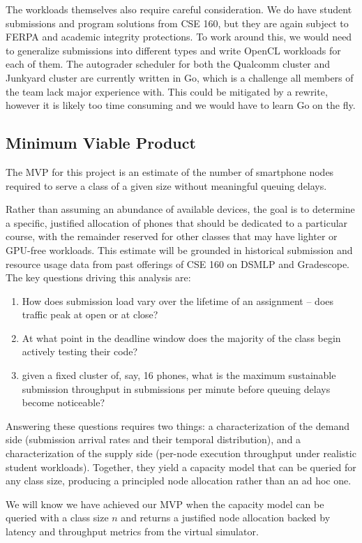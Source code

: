 \documentclass{article}
\begin{document}
The workloads themselves also require careful consideration. We do have student submissions and program solutions from CSE 160, but they are again subject to FERPA and academic integrity protections. To work around this, we would need to generalize submissions into different types and write OpenCL workloads for each of them. The autograder scheduler for both the Qualcomm cluster and Junkyard cluster are currently written in Go, which is a challenge all members of the team lack major experience with. This could be mitigated by a rewrite, however it is likely too time consuming and we would have to learn Go on the fly.
\newpage
\subsection{Minimum Viable Product}

The MVP for this project is an estimate of the number of smartphone nodes required to serve a class of a given size without meaningful queuing delays. 

Rather than assuming an abundance of available devices, the goal is to determine a specific, justified allocation of phones that should be dedicated to a particular course, with the remainder reserved for other classes that may have lighter or GPU-free workloads. This estimate will be grounded in historical submission and resource usage data from past offerings of CSE 160 on DSMLP and Gradescope. The key questions driving this analysis are: 
\begin{enumerate}
    \item How does submission load vary over the lifetime of an assignment -- does traffic peak at open or at close?
    \item At what point in the deadline window does the majority of the class begin actively testing their code?
    \item given a fixed cluster of, say, 16 phones, what is the maximum sustainable submission throughput in submissions per minute before queuing delays become noticeable?
\end{enumerate}
Answering these questions requires two things: a characterization of the demand side (submission arrival rates and their temporal distribution), and a characterization of the supply side (per-node execution throughput under realistic student workloads). Together, they yield a capacity model that can be queried for any class size, producing a principled node allocation rather than an ad hoc one.

We will know we have achieved our MVP when the capacity model can be queried with a class size
$n$ and returns a justified node allocation backed by latency and throughput metrics from the virtual simulator.
\end{document}

